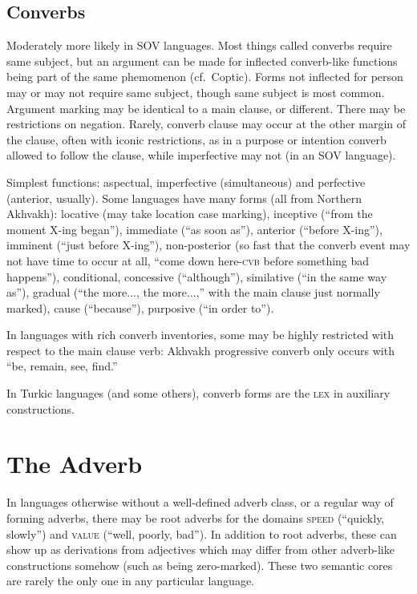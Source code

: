 \documentclass[11pt]{article}
\newcommand{\I}[1]{\textsc{#1}}   %
\begin{document}
\subsection{Converbs}
Moderately more likely in SOV languages. Most things called converbs
require same subject, but an argument can be made for inflected
converb-like functions being part of the same phemomenon (cf.\
Coptic).  Forms not inflected for person may or may not require same
subject, though same subject is most common.  Argument marking may be
identical to a main clause, or different.  There may be restrictions
on negation.  Rarely, converb clause may occur at the other margin of
the clause, often with iconic restrictions, as in a purpose or
intention converb allowed to follow the clause, while imperfective may
not (in an SOV language).

Simplest functions: aspectual, imperfective (simultaneous) and
perfective (anterior, usually). Some languages have many forms (all
from Northern Akhvakh): locative (may take location case marking),
inceptive (``from the moment X-ing began''), immediate (``as soon
as''), anterior (``before X-ing''), imminent (``just before X-ing''),
non-posterior (so fast that the converb event may not have time to
occur at all, ``come down here-\I{cvb} before something bad
happens''), conditional, concessive (``although''), similative (``in
the same way as''), gradual (``the more..., the more...,'' with the
main clause just normally marked), cause (``because''), purposive
(``in order to'').

In languages with rich converb inventories, some may be highly
restricted with respect to the main clause verb: Akhvakh progressive
converb only occurs with ``be, remain, see, find.''

In Turkic languages (and some others), converb forms are the \I{lex}
in auxiliary constructions.


\section{The Adverb}
In languages otherwise without a well-defined adverb class, or a
regular way of forming adverbs, there may be root adverbs for the
domains \I{speed} (``quickly, slowly'') and \I{value} (``well,
poorly, bad''). In addition to root adverbs, these can show up as
derivations from adjectives which may differ from other adverb-like
constructions somehow (such as being zero-marked). These two semantic
cores are rarely the only one in any particular language.
\end{document}
